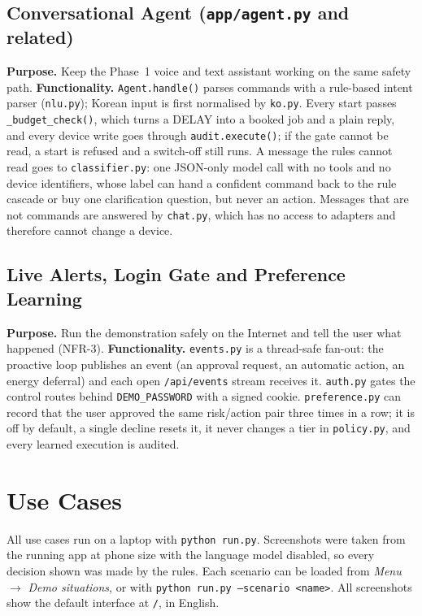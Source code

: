 \documentclass[conference]{IEEEtran}
\begin{document}
\subsection{Conversational Agent (\texttt{app/agent.py} and related)}
\textbf{Purpose.} Keep the Phase~1 voice and text assistant working on the same safety path.
\textbf{Functionality.} \texttt{Agent.handle()} parses commands with a rule-based intent parser (\texttt{nlu.py}); Korean input is first normalised by \texttt{ko.py}. Every start passes \texttt{\_budget\_check()}, which turns a DELAY into a booked job and a plain reply, and every device write goes through \texttt{audit.execute()}; if the gate cannot be read, a start is refused and a switch-off still runs. A message the rules cannot read goes to \texttt{classifier.py}: one JSON-only model call with no tools and no device identifiers, whose label can hand a confident command back to the rule cascade or buy one clarification question, but never an action. Messages that are not commands are answered by \texttt{chat.py}, which has no access to adapters and therefore cannot change a device.

\subsection{Live Alerts, Login Gate and Preference Learning}
\textbf{Purpose.} Run the demonstration safely on the Internet and tell the user what happened (NFR-3).
\textbf{Functionality.} \texttt{events.py} is a thread-safe fan-out: the proactive loop publishes an event (an approval request, an automatic action, an energy deferral) and each open \texttt{/api/events} stream receives it. \texttt{auth.py} gates the control routes behind \texttt{DEMO\_PASSWORD} with a signed cookie. \texttt{preference.py} can record that the user approved the same risk/action pair three times in a row; it is off by default, a single decline resets it, it never changes a tier in \texttt{policy.py}, and every learned execution is audited.

\section{Use Cases}
All use cases run on a laptop with \texttt{python run.py}. Screenshots were taken from the running app at phone size with the language model disabled, so every decision shown was made by the rules. Each scenario can be loaded from \emph{Menu} $\rightarrow$ \emph{Demo situations}, or with \texttt{python run.py --scenario <name>}. All screenshots show the default interface at \texttt{/}, in English.
\end{document}
